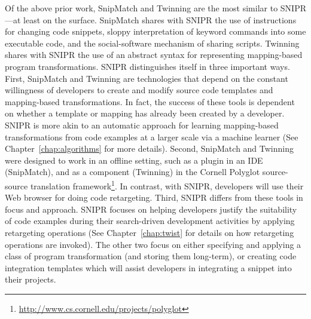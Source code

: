 Of the above prior work, SnipMatch and Twinning are the most similar to \uppercase{SnipR}---at least on the surface. SnipMatch shares with \uppercase{SnipR} the use of instructions for changing code snippets, sloppy interpretation of keyword commands into some executable code, and the social-software mechanism of sharing scripts. Twinning shares with \uppercase{SnipR} the use of an abstract syntax for representing mapping-based program transformations. \uppercase{SnipR} distinguishes itself in three important ways. First, SnipMatch and Twinning are technologies that depend on the constant willingness of developers to create and modify source code templates and mapping-based transformations. In fact, the success of these tools is dependent on whether a template or mapping has already been created by a developer. \uppercase{SnipR} is more akin to an automatic approach for learning mapping-based transformations from code examples at a larger scale via a machine learner (See Chapter~\ref{chap:algorithms} for more details). Second, SnipMatch and Twinning were designed to work in an offline setting, such as a plugin in an IDE (SnipMatch), and as a component (Twinning) in the Cornell Polyglot source-source translation framework\footnote{\url{http://www.cs.cornell.edu/projects/polyglot}}. In contrast, with \uppercase{SnipR}, developers will use their Web browser for doing code retargeting. Third, \uppercase{SnipR} differs from these tools in focus and approach. \uppercase{SnipR} focuses on helping developers justify the suitability of code examples during their search-driven development activities by applying retargeting operations (See Chapter~\ref{chap:twist} for details on how retargeting operations are invoked). The other two focus on either specifying and applying a class of program transformation (and storing them long-term), or creating code integration templates which will assist developers in integrating a snippet into their projects.  
